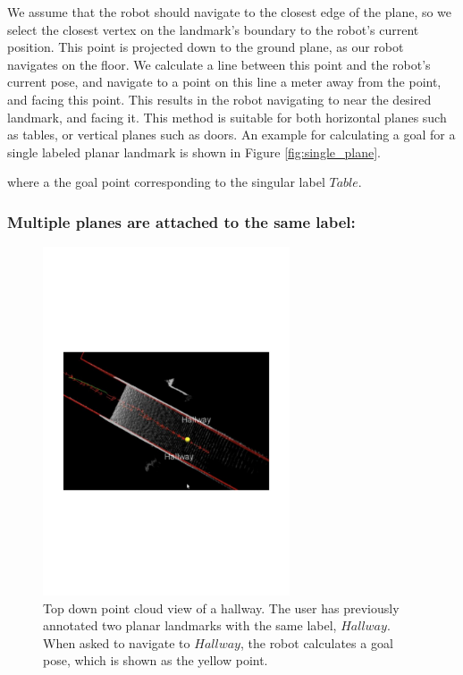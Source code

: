 \documentclass[12pt]{gatech-thesis}
\begin{document}
We assume that the robot should navigate to the closest edge of the plane, so we select the closest vertex on the landmark's boundary to the robot's current position. This point is projected down to the ground plane, as our robot navigates on the floor. We calculate a line between this point and the robot's current pose, and navigate to a point on this line a meter away from the point, and facing this point. This results in the robot navigating to near the desired landmark, and facing it. This method is suitable for both horizontal planes such as tables, or vertical planes such as doors. An example for calculating a goal for a single labeled planar landmark is shown in Figure \ref{fig:single_plane}. 

where a the goal point corresponding to the singular label $Table$. 

\subsubsection{Multiple planes are attached to the same label: }

\begin{figure}[ht!]
\centering
\includegraphics[width=0.65\textwidth]{pics/double_plane}
\caption{Top down point cloud view of a hallway. The user has previously annotated two planar landmarks with the same label, $Hallway$. When asked to navigate to $Hallway$, the robot calculates a goal pose, which is shown as the yellow point.}
\label{fig:double_plane}
\end{figure}
\end{document}
